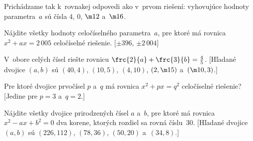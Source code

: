 {Prichádzame tak k~rovnakej odpovedi ako v~prvom riešení: vyhovujúce
hodnoty parametra~$a$ sú čísla $4$, $0$, $\m12$ a~$\m16$.

Nájdite všetky hodnoty celočíselného parametra~$a$, pre
ktoré má rovnica $x^2+ax=2\,005$ celočíselné riešenie. [$\pm396$,
$\pm2\,004$]

V~obore celých čísel riešte rovnicu
$\frc{2}{a}+\frc{3}{b}=\frac45$. [Hľadané dvojice $(a,b)$
sú $(40,4)$, $(10,5)$, $(4,10)$, $(2,\m15)$ a~$(\m10,3)$.]

Pre ktoré dvojice prvočísel $p$ a~$q$ má rovnica
$x^2+px=q^2$ celočíselné riešenie? [Jedine pre $p=3$ a~$q=2$.]

Nájdite všetky dvojice prirodzených čísel $a$ a~$b$, pre
ktoré má rovnica $x^2-ax+b^2=0$ dva korene, ktorých rozdiel sa
rovná číslu~30. [Hľadané dvojice $(a,b)$
sú $(226,112)$, $(78,36)$, $(50,20)$ a~$(34,8)$.]
}

